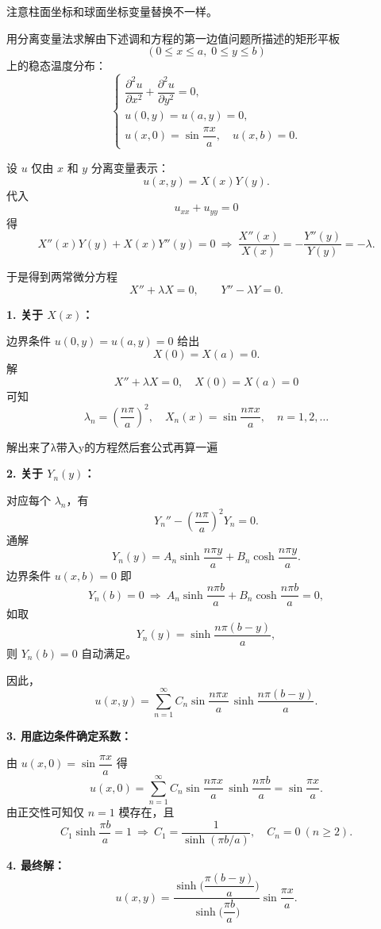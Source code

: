 \begin{dxtips}
    注意柱面坐标和球面坐标变量替换不一样。
\end{dxtips}
\begin{homework}[6]
用分离变量法求解由下述调和方程的第一边值问题所描述的矩形平板
\[
(0\le x\le a,\;0\le y\le b)
\]
上的稳态温度分布：
\[
\begin{cases}
\dfrac{\partial^2 u}{\partial x^2}
+\dfrac{\partial^2 u}{\partial y^2}=0,\\[0.6em]
u(0,y)=u(a,y)=0,\\[0.4em]
u(x,0)=\sin\dfrac{\pi x}{a},\quad u(x,b)=0.
\end{cases}
\]
\end{homework}
\begin{solution}
设 $u$ 仅由 $x$ 和 $y$ 分离变量表示：
\[
u(x,y)=X(x)Y(y).
\]
代入
\[
u_{xx}+u_{yy}=0
\]
得
\[
X''(x)Y(y)+X(x)Y''(y)=0
\ \Longrightarrow\
\frac{X''(x)}{X(x)}=-\frac{Y''(y)}{Y(y)}=-\lambda.
\]

于是得到两常微分方程
\[
X''+\lambda X=0,\qquad Y''-\lambda Y=0.
\]

\textbf{1. 关于 $X(x)$：}

边界条件 $u(0,y)=u(a,y)=0$ 给出
\[
X(0)=X(a)=0.
\]
解
\[
X''+\lambda X=0,\quad X(0)=X(a)=0
\]
可知
\[
\lambda_n=\left(\frac{n\pi}{a}\right)^2,\quad
X_n(x)=\sin\frac{n\pi x}{a},\quad n=1,2,\dots
\]
\begin{dxtips}
    解出来了λ带入y的方程然后套公式再算一遍
\end{dxtips}
\textbf{2. 关于 $Y_n(y)$：}

对应每个 $\lambda_n$，有
\[
Y_n''-\left(\frac{n\pi}{a}\right)^2 Y_n=0.
\]
通解
\[
Y_n(y)=A_n\sinh\frac{n\pi y}{a}+B_n\cosh\frac{n\pi y}{a}.
\]
边界条件 $u(x,b)=0$ 即
\[
Y_n(b)=0
\ \Longrightarrow\
A_n\sinh\frac{n\pi b}{a}+B_n\cosh\frac{n\pi b}{a}=0,
\]
如取
\[
Y_n(y)=\sinh\frac{n\pi (b-y)}{a},
\]
则 $Y_n(b)=0$ 自动满足。

因此，
\[
u(x,y)=\sum_{n=1}^\infty C_n \sin\frac{n\pi x}{a}\,
\sinh\frac{n\pi (b-y)}{a}.
\]

\textbf{3. 用底边条件确定系数：}

由 $u(x,0)=\sin\dfrac{\pi x}{a}$ 得
\[
u(x,0)=\sum_{n=1}^\infty C_n \sin\frac{n\pi x}{a}\,
\sinh\frac{n\pi b}{a}
=\sin\frac{\pi x}{a}.
\]
由正交性可知仅 $n=1$ 模存在，且
\[
C_1\sinh\frac{\pi b}{a}=1
\ \Longrightarrow\
C_1=\frac{1}{\sinh(\pi b/a)},\quad C_n=0\ (n\ge2).
\]

\textbf{4. 最终解：}
\[
u(x,y)
=\frac{\sinh\bigl(\dfrac{\pi (b-y)}{a}\bigr)}
       {\sinh\bigl(\dfrac{\pi b}{a}\bigr)}
  \sin\frac{\pi x}{a}.
\]

\end{solution}
